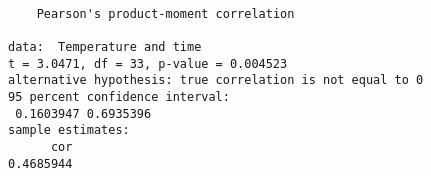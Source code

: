 \begin{verbatim} 

	Pearson's product-moment correlation

data:  Temperature and time
t = 3.0471, df = 33, p-value = 0.004523
alternative hypothesis: true correlation is not equal to 0
95 percent confidence interval:
 0.1603947 0.6935396
sample estimates:
      cor 
0.4685944 

\end{verbatim}